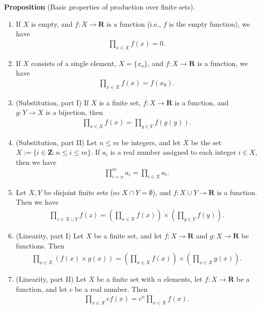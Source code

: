 \documentclass{book}
\newcommand{\titl}[1]{\noindent\textbf{#1}}
\begin{document}
\begin{framed}
\titl{Proposition} (Basic properties of production over finite sets).
\begin{enumerate}
    \item If $X$ is empty, and $f:X\to\mathbf{R}$ is a function (i.e., $f$ is the empty function), we have
    \begin{align*}
        \prod_{x\in X}f(x)=0.
    \end{align*}

    \item If $X$ consists of a single element, $X=\{x_o\}$, and $f:X\to\mathbf{R}$ is a function, we have
    \begin{align*}
        \prod_{x\in X}f(x)=f(x_0).
    \end{align*}

    \item (Substitution, part I) If $X$ is a finite set, $f: X\to\mathbf{R}$ is a function, and $g:Y\to X$ is a bijection, then
    \begin{align*}
        \prod_{x\in X}f(x)=\prod_{y\in Y}f(g(y)).
    \end{align*}

    \item (Substitution, part I\!I) Let $n\leq m$ be integers, and let $X$ be the set $X:=\{i\in\mathbf{Z}:n\leq i\leq m\}$. If $a_i$ is a real number assigned to each integer $i\in X$, then we have
    \begin{align*}
        \prod_{i=n}^{m}a_i=\prod_{i\in X}a_i.
    \end{align*}

    \item Let $X, Y$ be disjoint finite sets (so $X\cap Y=\emptyset$), and $f:X\cup Y\to\mathbf{R}$ is a function. Then we have
    \begin{align*}
        \prod_{z\in X\cup Y}f(z)=\left(\prod_{x\in X}f(x)\right)\times\left(\prod_{y\in Y}f(y)\right).
    \end{align*}

    \item (Linearity, part I) Let $X$ be a finite set, and let $f:X\to\mathbf{R}$ and $g:X\to\mathbf{R}$ be functions. Then
    \begin{align*}
        \prod_{x\in X}\left(f(x)\times g(x)\right)=\left(\prod_{x\in X}f(x)\right)\times\left(\prod_{x\in X}g(x)\right).
    \end{align*}

    \item (Linearity, part I\!I) Let $X$ be a finite set with $n$ elements, let $f:X\to\mathbf{R}$ be a function, and let $c$ be a real number. Then
    \begin{align*}
        \prod_{x\in X}cf(x)=c^n\prod_{x\in X}f(x).
    \end{align*}


\end{enumerate}
\end{framed}
\end{document}
